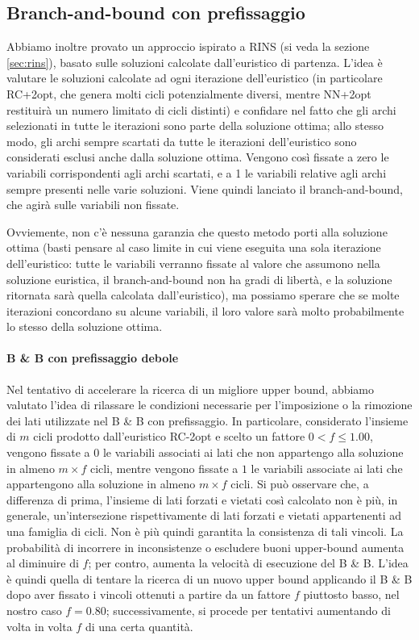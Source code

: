 \subsection{Branch-and-bound con prefissaggio}\label{sec:bbprefiss}
Abbiamo inoltre provato un approccio ispirato a RINS (si veda la sezione \ref{sec:rins}), basato sulle soluzioni calcolate dall’euristico di partenza. L’idea è valutare le soluzioni calcolate ad ogni iterazione dell’euristico (in particolare RC+2opt, che genera molti cicli potenzialmente diversi, mentre NN+2opt restituirà un numero limitato di cicli distinti) e confidare nel fatto che gli archi selezionati in tutte le iterazioni sono parte della soluzione ottima; allo stesso modo, gli archi sempre scartati da tutte le iterazioni dell’euristico sono considerati esclusi anche dalla soluzione ottima. Vengono così fissate a zero le variabili corrispondenti agli archi scartati, e a 1 le variabili relative agli archi sempre presenti nelle varie soluzioni. Viene quindi lanciato il branch-and-bound, che agirà sulle variabili non fissate.

Ovviemente, non c’è nessuna garanzia che questo metodo porti alla soluzione ottima (basti pensare al caso limite in cui viene eseguita una sola iterazione dell’euristico: tutte le variabili verranno fissate al valore che assumono nella soluzione euristica, il branch-and-bound non ha gradi di libertà, e la soluzione ritornata sarà quella calcolata dall’euristico), ma possiamo sperare che se molte iterazioni concordano su alcune variabili, il loro valore sarà molto probabilmente lo stesso della soluzione ottima.

\paragraph{B \& B con prefissaggio debole} 
Nel tentativo di accelerare la ricerca di un migliore upper bound, abbiamo valutato l'idea di rilassare le condizioni necessarie per l'imposizione o la rimozione dei lati utilizzate nel B \& B con prefissaggio. In particolare, considerato l'insieme di $m$ cicli prodotto dall'euristico RC-2opt e scelto un fattore $0 < f \leq 1.00$, vengono fissate a $0$ le variabili associati ai lati che non appartengo alla soluzione in almeno $m \times f$ cicli, mentre vengono fissate a $1$ le variabili associate ai lati che appartengono alla soluzione in almeno $m \times f$ cicli. Si può osservare che, a differenza di prima, l'insieme di lati forzati e vietati così calcolato non è più, in generale, un'intersezione rispettivamente di lati forzati e vietati appartenenti ad una famiglia di cicli. Non è più quindi garantita la consistenza di tali vincoli. La probabilità di incorrere in inconsistenze o escludere buoni upper-bound aumenta al diminuire di $f$; per contro, aumenta la velocità di esecuzione del B \& B. L'idea è quindi quella di tentare la ricerca di un nuovo upper bound applicando il B \& B dopo aver fissato i vincoli ottenuti a partire da un fattore $f$ piuttosto basso, nel nostro caso $f = 0.80$; successivamente, si procede per tentativi aumentando di volta in volta $f$ di una certa quantità.

